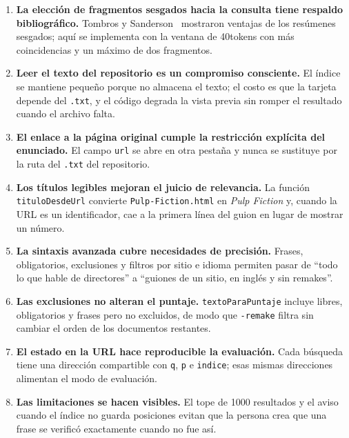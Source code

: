 \documentclass[11pt,spanish]{article}
\begin{document}
\begin{enumerate}[label=\textbf{C\arabic*}.]
  \item \textbf{La elección de fragmentos sesgados hacia la consulta tiene
    respaldo bibliográfico.} Tombros y Sanderson~\cite{tombros1998} mostraron
    ventajas de los resúmenes sesgados; aquí se implementa con la ventana de
    40tokens con más coincidencias y un máximo de dos fragmentos.

  \item \textbf{Leer el texto del repositorio es un compromiso consciente.} El
    índice se mantiene pequeño porque no almacena el texto; el costo es que la
    tarjeta depende del \texttt{.txt}, y el código degrada la vista previa sin
    romper el resultado cuando el archivo falta.

  \item \textbf{El enlace a la página original cumple la restricción explícita
    del enunciado.} El campo \texttt{url} se abre en otra pestaña y nunca se
    sustituye por la ruta del \texttt{.txt} del repositorio.

  \item \textbf{Los títulos legibles mejoran el juicio de relevancia.} La
    función \texttt{tituloDesdeUrl} convierte \texttt{Pulp-Fiction.html} en
    \emph{Pulp Fiction} y, cuando la URL es un identificador, cae a la primera
    línea del guion en lugar de mostrar un número.

  \item \textbf{La sintaxis avanzada cubre necesidades de precisión.} Frases,
    obligatorios, exclusiones y filtros por sitio e idioma permiten pasar de
    ``todo lo que hable de directores'' a ``guiones de un sitio, en inglés y
    sin remakes''.

  \item \textbf{Las exclusiones no alteran el puntaje.} \texttt{textoParaPuntaje}
    incluye libres, obligatorios y frases pero no excluidos, de modo que
    \texttt{-remake} filtra sin cambiar el orden de los documentos restantes.

  \item \textbf{El estado en la URL hace reproducible la evaluación.} Cada
    búsqueda tiene una dirección compartible con \texttt{q}, \texttt{p} e
    \texttt{indice}; esas mismas direcciones alimentan el modo de evaluación.

  \item \textbf{Las limitaciones se hacen visibles.} El tope de 1000
    resultados y el aviso cuando el índice no guarda posiciones evitan que la
    persona crea que una frase se verificó exactamente cuando no fue así.


\end{enumerate}
\end{document}
